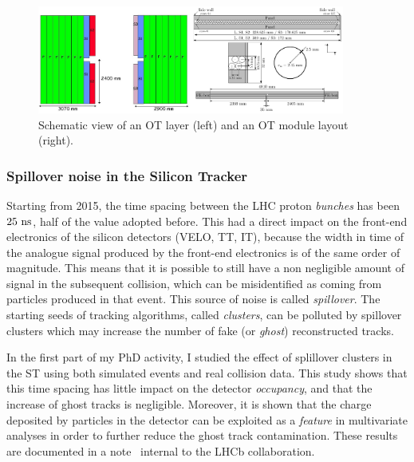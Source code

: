 \begin{figure}[t!]
  \begin{center}
    \includegraphics[width=0.9\textwidth]{02LHCb/figs/OT.png}
  \end{center}
  \vspace{-2mm}
  \caption{Schematic view of an OT layer (left) and an OT module layout (right).}
  \label{fig:OT}
\end{figure}

\subsubsection*{Spillover noise in the Silicon Tracker}

Starting from 2015, the time spacing between the LHC proton \emph{bunches} has been $25~\rm ns$, half of the value adopted before. This had a direct impact on the front-end electronics of the silicon detectors (VELO, TT, IT), because the width in time of the analogue signal produced by the front-end electronics is of the same order of magnitude. This means that it is possible to still have a non negligible amount of signal in the subsequent collision, which can be misidentified as coming from particles produced in that event. This source of noise is called \emph{spillover}. The starting seeds of tracking algorithms, called \emph{clusters}, can be polluted by spillover clusters which may increase the number of fake (or \emph{ghost}) reconstructed tracks. 

In the first part of my PhD activity, I studied the effect of splillover clusters in the ST using both simulated events and real collision data. This study shows that this time spacing has little impact on the detector \emph{occupancy}, and that the increase of ghost tracks is negligible. Moreover, it is shown that the charge deposited by particles in the detector can be exploited as a \emph{feature} in multivariate analyses in order to further reduce the ghost track contamination. These results are documented in a note~\cite{spillover} internal to the LHCb collaboration.

